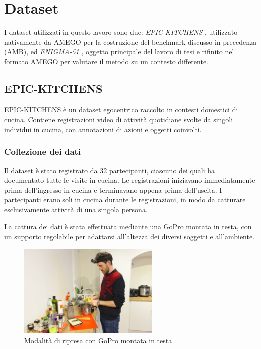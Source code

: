 \chapter{Dataset}

I dataset utilizzati in questo lavoro sono due: \emph{EPIC-KITCHENS} \cite{Damen2021PAMI}, utilizzato nativamente da AMEGO per la costruzione del benchmark discusso in precedenza (AMB), ed \emph{ENIGMA-51} \cite{ragusa2023enigma51}, oggetto principale del lavoro di tesi e rifinito nel formato AMEGO per valutare il metodo su un contesto differente.

\section{EPIC-KITCHENS}
EPIC-KITCHENS è un dataset egocentrico raccolto in contesti domestici di cucina. Contiene registrazioni video di attività quotidiane svolte da singoli individui in cucina, con annotazioni di azioni e oggetti coinvolti. 

\subsection*{Collezione dei dati}
Il dataset è stato registrato da 32 partecipanti, ciascuno dei quali ha documentato tutte le visite in cucina. Le registrazioni iniziavano immediatamente prima dell'ingresso in cucina e terminavano appena prima dell'uscita. I partecipanti erano soli in cucina durante le registrazioni, in modo da catturare esclusivamente attività di una singola persona.  

La cattura dei dati è stata effettuata mediante una GoPro montata in testa, con un supporto regolabile per adattarsi all'altezza dei diversi soggetti e all'ambiente.  

\begin{figure}[ht]
    \centering
    \includegraphics[width=0.6\textwidth]{Images/goproepic.png}
    \caption{Modalità di ripresa con GoPro montata in testa}
\end{figure}

